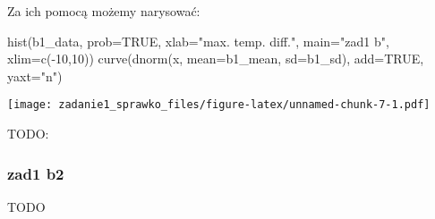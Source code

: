 \documentclass[
]{article}
\newenvironment{Shaded}{\begin{snugshade}}{\end{snugshade}}
\newcommand{\AttributeTok}[1]{\textcolor[rgb]{0.77,0.63,0.00}{#1}}
\newcommand{\ConstantTok}[1]{\textcolor[rgb]{0.00,0.00,0.00}{#1}}
\newcommand{\DecValTok}[1]{\textcolor[rgb]{0.00,0.00,0.81}{#1}}
\newcommand{\FunctionTok}[1]{\textcolor[rgb]{0.00,0.00,0.00}{#1}}
\newcommand{\NormalTok}[1]{#1}
\newcommand{\SpecialCharTok}[1]{\textcolor[rgb]{0.00,0.00,0.00}{#1}}
\newcommand{\StringTok}[1]{\textcolor[rgb]{0.31,0.60,0.02}{#1}}
\begin{document}
Za ich pomocą możemy narysować:

\begin{Shaded}
\begin{Highlighting}[]
\FunctionTok{hist}\NormalTok{(b1\_data, }\AttributeTok{prob=}\ConstantTok{TRUE}\NormalTok{, }\AttributeTok{xlab=}\StringTok{"max. temp. diff."}\NormalTok{, }\AttributeTok{main=}\StringTok{"zad1 b"}\NormalTok{, }\AttributeTok{xlim=}\FunctionTok{c}\NormalTok{(}\SpecialCharTok{{-}}\DecValTok{10}\NormalTok{,}\DecValTok{10}\NormalTok{))}
\FunctionTok{curve}\NormalTok{(}\FunctionTok{dnorm}\NormalTok{(x, }\AttributeTok{mean=}\NormalTok{b1\_mean, }\AttributeTok{sd=}\NormalTok{b1\_sd), }\AttributeTok{add=}\ConstantTok{TRUE}\NormalTok{, }\AttributeTok{yaxt=}\StringTok{"n"}\NormalTok{)}
\end{Highlighting}
\end{Shaded}

\texttt{[image: zadanie1\_sprawko\_files/figure-latex/unnamed-chunk-7-1.pdf]}

TODO:

\hypertarget{zad1-b2}{%
\subsubsection{zad1 b2}\label{zad1-b2}}

TODO
\end{document}
